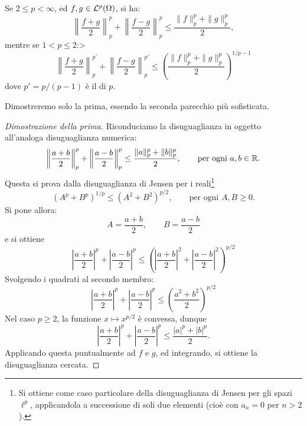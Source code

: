 \begin{theorem}
	Se $2 \leq p < \infty$, ed $f,g \in \mathcal{L}^p(\Omega)$, si ha:
	\begin{equation*}
		\left\|\frac{f+g}2 \right\|_p^p + \left\|\frac{f - g}2 \right\|_p^p \leq \frac{\|f\|_p^p + \|g\|_p^p}2,
	\end{equation*}
	mentre se $1 < p \leq 2$:>
	\begin{equation*}
		\left\|\frac{f+g}2 \right\|_p^{p'} + \left\|\frac{f - g}2 \right\|_p^{p'} \leq \left( \frac{\|f\|_p^p + \|g\|_p^p}2 \right)^{1/p-1}
	\end{equation*}
	dove $p' = p/(p-1)$ è il  di $p$.
\end{theorem}
Dimostreremo solo la prima, essendo la seconda parecchio più sofisticata.
\begin{proof}[Dimostrazione della prima]
	Riconduciamo la disuguaglianza in oggetto all'analoga disuguaglianza numerica:
	\begin{equation*}
		\left\|\frac{a+b}2 \right\|_p^p + \left\|\frac{a - b}2 \right\|_p^p \leq \frac{\|a\|_p^p + \|b\|_p^p}2, \qquad \text{per ogni $a,b \in \mathbb{R}$}.
	\end{equation*}
	Questa si prova dalla disuguaglianza di Jensen per i reali\footnote{Si ottiene come caso particolare della disuguaglianza di Jensen per gli spazi $\ell^p$, applicandola a successione di soli due elementi (cioè con $a_n = 0$ per $n>2$).}
	\begin{equation*}
		(A^p + B^p)^{1/p} \leq (A^2+B^2)^{p/2}, \qquad \text{per ogni $A,B \geq 0$}.
	\end{equation*}
	Si pone allora:
	\begin{equation*}
		A = \frac{a+b}2, \qquad B = \frac{a-b}2
	\end{equation*}
	e si ottiene
	\begin{equation*}
		\left| \frac{a+b}2 \right|^p + \left|\frac{a-b}2\right|^p \leq \left( \left| \frac{a+b}2 \right|^2 + \left|\frac{a-b}2\right|^2 \right)^{p/2}
	\end{equation*}
	Svolgendo i quadrati al secondo membro:
	\begin{equation*}
		\left| \frac{a+b}2 \right|^p + \left|\frac{a-b}2\right|^p \leq \left( \frac{a^2+b^2}2 \right)^{p/2}
	\end{equation*}
	Nel caso $p \geq 2$, la funzione $x \mapsto x^{p/2}$ è convessa, dunque
	\begin{equation*}
		\left| \frac{a+b}2 \right|^p + \left|\frac{a-b}2\right|^p \leq\frac{|a|^p + |b|^p}2.
	\end{equation*}
	Applicando questa puntualmente ad $f$ e $g$, ed integrando, si ottiene la disuguaglianza cercata.
\end{proof}

